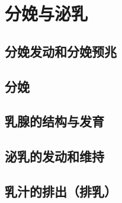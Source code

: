 \chapter{分娩与泌乳}

\section{分娩发动和分娩预兆}

\section{分娩}

\section{乳腺的结构与发育}

\section{泌乳的发动和维持}

\section{乳汁的排出（排乳）}